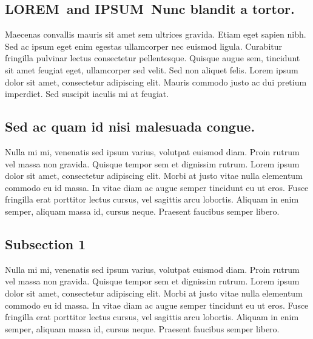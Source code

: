\documentclass[10pt,letterpaper]{article}
\newcommand{\lorem}{{\bf LOREM}}
\newcommand{\ipsum}{{\bf IPSUM}}
\begin{document}
\subsection*{\lorem\ and \ipsum\ Nunc blandit a tortor.}

Maecenas convallis mauris sit amet sem ultrices gravida. Etiam eget sapien nibh. Sed ac ipsum eget enim egestas ullamcorper nec euismod ligula. Curabitur fringilla pulvinar lectus consectetur pellentesque. Quisque augue sem, tincidunt sit amet feugiat eget, ullamcorper sed velit. Sed non aliquet felis. Lorem ipsum dolor sit amet, consectetur adipiscing elit. Mauris commodo justo ac dui pretium imperdiet. Sed suscipit iaculis mi at feugiat. 

\subsection*{Sed ac quam id nisi malesuada congue.}

Nulla mi mi, venenatis sed ipsum varius, volutpat euismod diam. Proin rutrum vel massa non gravida. Quisque tempor sem et dignissim rutrum. Lorem ipsum dolor sit amet, consectetur adipiscing elit. Morbi at justo vitae nulla elementum commodo eu id massa. In vitae diam ac augue semper tincidunt eu ut eros. Fusce fringilla erat porttitor lectus cursus, vel sagittis arcu lobortis. Aliquam in enim semper, aliquam massa id, cursus neque. Praesent faucibus semper libero.

\subsection*{Subsection 1}
Nulla mi mi, venenatis sed ipsum varius, volutpat euismod diam. Proin rutrum vel massa non gravida. Quisque tempor sem et dignissim rutrum. Lorem ipsum dolor sit amet, consectetur adipiscing elit. Morbi at justo vitae nulla elementum commodo eu id massa. In vitae diam ac augue semper tincidunt eu ut eros. Fusce fringilla erat porttitor lectus cursus, vel sagittis arcu lobortis. Aliquam in enim semper, aliquam massa id, cursus neque. Praesent faucibus semper libero.
\end{document}

